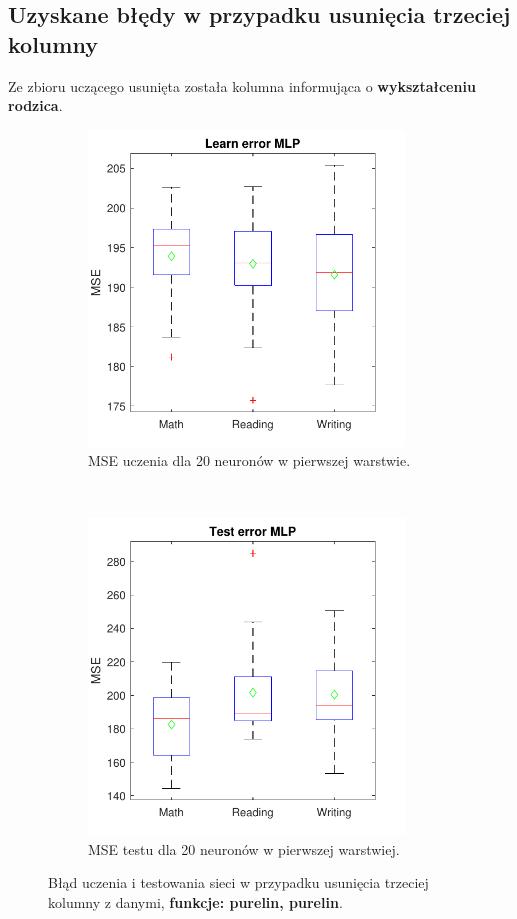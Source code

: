 \documentclass[12pt]{article}
\begin{document}
\pagebreak
\subsection{Uzyskane błędy w przypadku usunięcia trzeciej kolumny}
Ze zbioru uczącego usunięta została kolumna informująca o \textbf{wykształceniu rodzica}.

\begin{figure}[H]
\centering
\begin{subfigure}[t]{0.48\textwidth} 
\centering
\includegraphics[height=3.3in]{purelin_purelin_20_without_3_learnBoxplot.pdf}
\caption{MSE uczenia dla  20 neuronów w pierwszej warstwie.}
\end{subfigure}
~~
\begin{subfigure}[t]{0.48\textwidth} 
\centering
\includegraphics[height=3.3in]{purelin_purelin_20_without_3_testBoxplot.pdf}
\caption{MSE testu dla  20  neuronów w pierwszej warstwiej.}
\end{subfigure}

\caption{Błąd uczenia i testowania sieci w przypadku usunięcia trzeciej  kolumny z danymi, \textbf{funkcje: purelin, purelin}.}
\end{figure}
\end{document}
